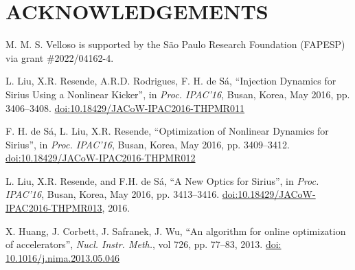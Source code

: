 \documentclass[a4paper,
               keeplastbox,   %
               ]{jacow}
\begin{document}
\section{ACKNOWLEDGEMENTS}
M. M. S. Velloso is supported by the São Paulo Research Foundation (FAPESP) via grant \#2022/04162-4. 
%
%
	
	\begin{thebibliography}{9} %
	
        

        L. Liu, X.R. Resende, A.R.D. Rodrigues, F. H. de Sá,
       \textquotedblleft{{I}njection {D}ynamics for {S}irius {U}sing a {N}onlinear {K}icker}\textquotedblright,
       in \emph{Proc. IPAC’16}, Busan, Korea, May 2016, pp. 3406--3408.
       \url{doi:10.18429/JACoW-IPAC2016-THPMR011} 
 
        F. H. de Sá, L. Liu, X.R. Resende,
       \textquotedblleft{{O}ptimization of {N}onlinear {D}ynamics for {S}irius}\textquotedblright,
       in \emph{Proc. IPAC’16}, Busan, Korea, May 2016, pp. 3409--3412.
       \url{doi:10.18429/JACoW-IPAC2016-THPMR012}

       L. Liu, X.R. Resende, and F.H. de Sá,
       \textquotedblleft{A New Optics for Sirius}\textquotedblright,
     in \emph{Proc. IPAC'16}, Busan, Korea, May 2016, pp. 3413--3416.
       \url{doi:10.18429/JACoW-IPAC2016-THPMR013}, 2016.
           
		X. Huang, J. Corbett, J. Safranek, J. Wu,
		\textquotedblleft{An algorithm for online optimization of accelerators}\textquotedblright,
		\emph{Nucl.  Instr. Meth.}, vol 726, pp. 77--83, 2013.
        \url{doi: 10.1016/j.nima.2013.05.046}


\end{thebibliography}
\end{document}
